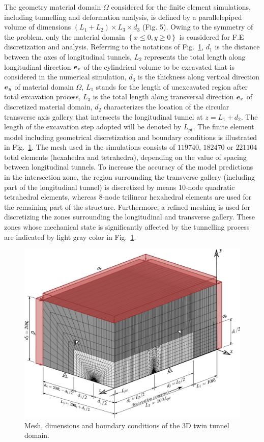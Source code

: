 \documentclass[a4paper,fleqn]{cas-sc}
\begin{document}
The geometry material domain $\Omega$ considered for the finite element simulations, including tunnelling and deformation analysis, is defined by a parallelepiped volume of dimensions $\left(L_1+L_2 \right ) \times L_3 \times d_3$ (Fig. 5). Owing to the symmetry of the problem, only the material domain $\left\{x \le 0, y \ge 0\right\}$   is considered for F.E discretization and analysis. Referring to the notations of Fig.~\ref{Mesh1}, $d_1$ is the distance between the axes of longitudinal tunnels, $L_2$  represents the total length  along longitudinal direction $\boldsymbol{e}_z$ of the cylindrical  volume to be excavated that is  considered in the numerical simulation, $d_3$ is the thickness along vertical direction $\boldsymbol{e}_y$ of material domain $\Omega$, $L_1$ stands for the length of unexcavated region after total excavation process, $L_3$ is the total length along transversal direction $\boldsymbol{e}_x$ of discretized material domain, $d_2$ characterizes the location of the circular transverse axis gallery that intersects the  longitudinal tunnel at $z = L_1+d_2$. The length of the excavation step adopted  will be denoted by $L_{pt}$. The finite element model including geometrical discretization and boundary conditions is illustrated in Fig.~\ref{Mesh1}. The mesh used in the simulations consists of $119740$, $182470$ or $221104$ total elements (hexahedra and tetrahedra), depending on the value of spacing between longitudinal tunnels. To increase the accuracy of the model predictions in the intersection zone, the region surrounding the transverse gallery (including part of the longitudinal tunnel) is discretized by means 10-node quadratic tetrahedral elements, whereas 8-node trilinear hexahedral elements are used for the remaining part of the structure.   Furthermore, a refined meshing is used for discretizing the zones surrounding the longitudinal and transverse gallery. These zones whose mechanical state is significantly affected by the tunnelling process are indicated by light gray color in Fig.~\ref{Mesh1}.
\begin{figure}[h!]
	\centering
	\includegraphics[scale=0.5]{Mesh1.pdf}
	\caption{Mesh, dimensions and boundary conditions of the 3D twin tunnel domain.}
	\label{Mesh1}
\end{figure}
\end{document}
